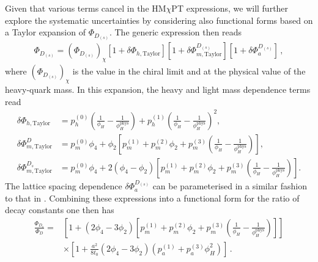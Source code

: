 Given that various terms cancel in the  HM$\chi$PT expressions, we will further explore the systematic uncertainties by considering  also functional forms based on a Taylor expansion of $\Phi_{D_{(s)}}$. The generic
expression then reads
\begin{align}
	\Phi_{D_{(s)}}= \left( \Phi_{D_{(s)}}\right)_{\chi} \left[ 1 + \delta \Phi_{{h,\mathrm{Taylor}}} \right] \left[ 1 + \delta \Phi_{{m,\mathrm{Taylor}}}^{D_{(s)}} \right] \left[ 1 + \delta \Phi_a^{D_{(s)}}  \right]
	\,,
	\label{eq:phiqcontT}
\end{align}
where $ \left( \Phi_{D_{(s)}}\right)_{\chi}$ is the value in
the chiral limit and at the physical value of the heavy-quark mass.
In this expansion, the heavy and light mass dependence terms read
\begin{equation}
	\begin{split}
		\delta \Phi_{{h,\mathrm{Taylor}}} &=  p_h^{(0)} \left( \frac{1}{\phi_H} - \frac{1}{\phi_H^{\mathrm{phys}}} \right) + p_h^{(1)} \left( \frac{1}{\phi_H} - \frac{1}{\phi_H^{\mathrm{phys}}} \right)^2 ,
		\\
		\delta \Phi_{{m,\mathrm{Taylor}}}^{D} &=  p_m^{(0)} \phi_4 + \phi_2 \left[ p_m^{(1)}  +  p_m^{(2)} \phi_2 + p_m^{(3)} \left( \frac{1}{\phi_H} - \frac{1}{\phi_H^{\mathrm{phys}}} \right)  \right] ,
		\\
		\delta \Phi_{{m,\mathrm{Taylor}}}^{D_s} &=  p_m^{(0)} \phi_4 + 2 (\phi_4 - \phi_2)  \left[ p_m^{(1)}  + p_m^{(2)} \phi_2 + p_m^{(3)} \left( \frac{1}{\phi_H} - \frac{1}{\phi_H^{\mathrm{phys}}} \right)  \right].
		\label{eq:deltaphiTs} 
	\end{split}
\end{equation}
The lattice spacing dependence  $\delta \Phi_{a}^{D_{(s)}}$ can be parameterised in a similar fashion to that in .
Combining these expressions into a functional form for the ratio of decay constants one then has
\begin{align}
	\frac{\Phi_{D_s}}{\Phi_D}   =& \left[  1 +  \left( 2 \phi_4 - 3 \phi_2 \right)  \left[ p_m^{(1)}  +  p_m^{(2)} \phi_2 + p_m^{(3)} \left( \frac{1}{\phi_H} - \frac{1}{\phi_H^{\mathrm{phys}}} \right) \right]  \right]  
	\nonumber \\
	& \times \left[ 1+ \frac{a^2}{8t_0}  \left( 2 \phi_4 - 3 \phi_2 \right) \left( p_a^{(1)} + p_a^{(3)} \phi_H^2 \right)  \right] \,.
	\label{eq:ratiophiT}
\end{align}

